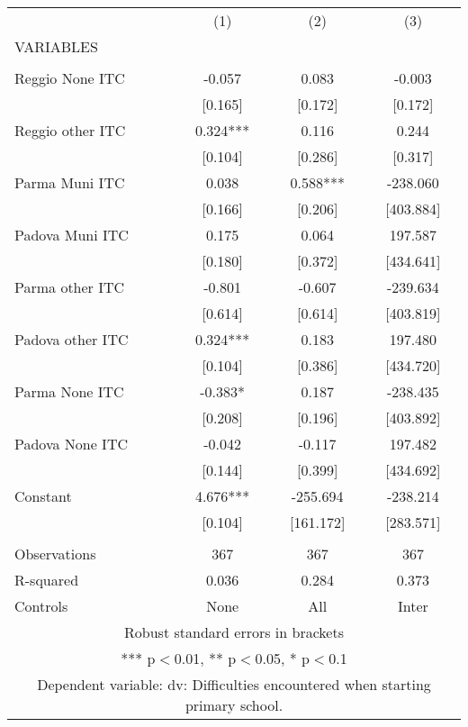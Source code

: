 \begin{tabular}{lccc} \hline
 & (1) & (2) & (3) \\
VARIABLES &  &  &  \\ \hline
 &  &  &  \\
Reggio None ITC & -0.057 & 0.083 & -0.003 \\
 & [0.165] & [0.172] & [0.172] \\
Reggio other ITC & 0.324*** & 0.116 & 0.244 \\
 & [0.104] & [0.286] & [0.317] \\
Parma Muni ITC & 0.038 & 0.588*** & -238.060 \\
 & [0.166] & [0.206] & [403.884] \\
Padova Muni ITC & 0.175 & 0.064 & 197.587 \\
 & [0.180] & [0.372] & [434.641] \\
Parma other ITC & -0.801 & -0.607 & -239.634 \\
 & [0.614] & [0.614] & [403.819] \\
Padova other ITC & 0.324*** & 0.183 & 197.480 \\
 & [0.104] & [0.386] & [434.720] \\
Parma None ITC & -0.383* & 0.187 & -238.435 \\
 & [0.208] & [0.196] & [403.892] \\
Padova None ITC & -0.042 & -0.117 & 197.482 \\
 & [0.144] & [0.399] & [434.692] \\
Constant & 4.676*** & -255.694 & -238.214 \\
 & [0.104] & [161.172] & [283.571] \\
 &  &  &  \\
Observations & 367 & 367 & 367 \\
R-squared & 0.036 & 0.284 & 0.373 \\
 Controls & None & All & Inter \\ \hline
\multicolumn{4}{c}{ Robust standard errors in brackets} \\
\multicolumn{4}{c}{ *** p$<$0.01, ** p$<$0.05, * p$<$0.1} \\
\multicolumn{4}{c}{ Dependent variable: dv: Difficulties encountered when starting primary school.} \\
\end{tabular}
